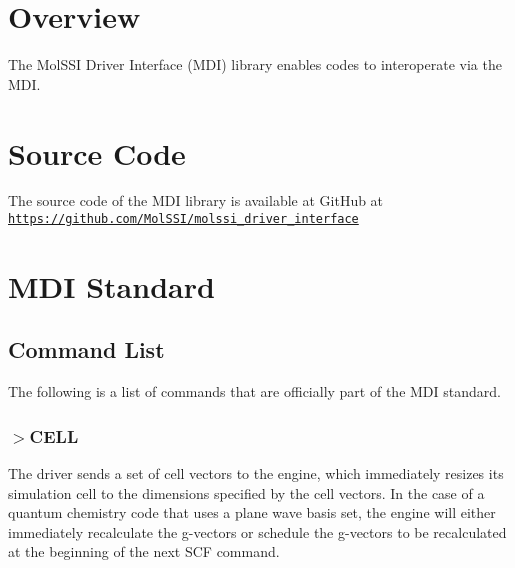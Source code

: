 \hypertarget{index_overview_sec}{}\section{Overview}\label{index_overview_sec}
The Mol\-S\-S\-I Driver Interface (M\-D\-I) library enables codes to interoperate via the M\-D\-I.\hypertarget{index_source_sec}{}\section{Source Code}\label{index_source_sec}
The source code of the M\-D\-I library is available at Git\-Hub at \href{https://github.com/MolSSI/molssi_driver_interface}{\tt https\-://github.\-com/\-Mol\-S\-S\-I/molssi\-\_\-driver\-\_\-interface}\hypertarget{index_commands_sec}{}\section{M\-D\-I Standard}\label{index_commands_sec}
\hypertarget{index_command_list}{}\subsection{Command List}\label{index_command_list}
The following is a list of commands that are officially part of the M\-D\-I standard.\hypertarget{index_set_cell}{}\subsubsection{$>$\-C\-E\-L\-L}\label{index_set_cell}
The driver sends a set of cell vectors to the engine, which immediately resizes its simulation cell to the dimensions specified by the cell vectors. In the case of a quantum chemistry code that uses a plane wave basis set, the engine will either immediately recalculate the g-\/vectors or schedule the g-\/vectors to be recalculated at the beginning of the next S\-C\-F command.

